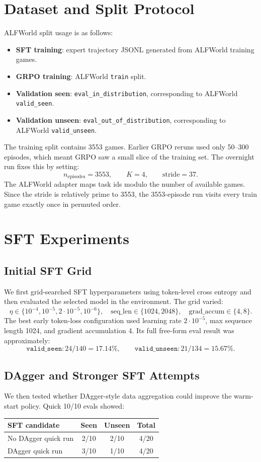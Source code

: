 \documentclass[10pt]{article}
\begin{document}
\section{Dataset and Split Protocol}
ALFWorld split usage is as follows:
\begin{itemize}
    \item \textbf{SFT training}: expert trajectory JSONL generated from ALFWorld training games.
    \item \textbf{GRPO training}: ALFWorld \texttt{train} split.
    \item \textbf{Validation seen}: \texttt{eval\_in\_distribution}, corresponding to ALFWorld \texttt{valid\_seen}.
    \item \textbf{Validation unseen}: \texttt{eval\_out\_of\_distribution}, corresponding to ALFWorld \texttt{valid\_unseen}.
\end{itemize}

The training split contains 3553 games. Earlier GRPO reruns used only 50--300 episodes, which meant GRPO saw a small slice of the training set. The overnight run fixes this by setting:
\[
n_{\mathrm{episodes}} = 3553,\qquad K=4,\qquad \mathrm{stride}=37.
\]
The ALFWorld adapter maps task ids modulo the number of available games. Since the stride is relatively prime to 3553, the 3553-episode run visits every train game exactly once in permuted order.

\section{SFT Experiments}
\subsection{Initial SFT Grid}
We first grid-searched SFT hyperparameters using token-level cross entropy and then evaluated the selected model in the environment. The grid varied:
\[
\eta \in \{10^{-4}, 10^{-5}, 2\cdot10^{-5}, 10^{-6}\},\quad
\mathrm{seq\_len}\in\{1024,2048\},\quad
\mathrm{grad\_accum}\in\{4,8\}.
\]
The best early token-loss configuration used learning rate \(2\cdot10^{-5}\), max sequence length 1024, and gradient accumulation 4. Its full free-form eval result was approximately:
\[
\texttt{valid\_seen}: 24/140 = 17.14\%,\qquad
\texttt{valid\_unseen}: 21/134 = 15.67\%.
\]

\subsection{DAgger and Stronger SFT Attempts}
We then tested whether DAgger-style data aggregation could improve the warm-start policy. Quick 10/10 evals showed:
\begin{center}
\begin{tabular}{lccc}
\toprule
SFT candidate & Seen & Unseen & Total \\
\midrule
No DAgger quick run & 2/10 & 2/10 & 4/20 \\
DAgger quick run & 3/10 & 1/10 & 4/20 \\
\bottomrule
\end{tabular}
\end{center}
\end{document}

